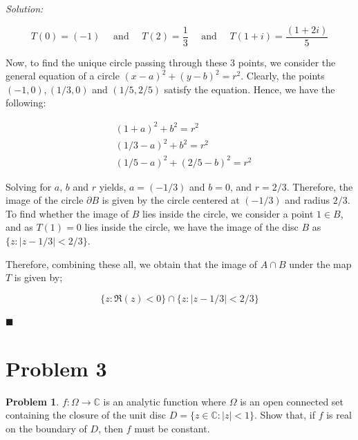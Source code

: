 \documentclass[12pt]{article}
\newcommand{\C}{\mathbb{C}}
\theoremstyle{definition}
\newtheorem*{prb}{Problem}
\newenvironment{problem}{
\begin{tcolorbox}[colback=blue!5!white,colframe=blue!75!black, parbox = true] \begin{prb}  }{\end{prb}\end{tcolorbox} }
\newenvironment{answer}{\textit{Solution: }\quad }{ \hfill $\blacksquare$}
\numberwithin{equation}{section}
\begin{document}
\begin{answer}
\begin{enumerate}
		$$
		T(0) = (-1) \quad \text{ and } \quad
		T(2) = \dfrac{1}{3} \quad \text{ and } \quad
		T(1+i) = \dfrac{(1 + 2i)}{5}
		$$

		Now, to find the unique circle passing through these 3 points, we consider the general equation of a circle $(x - a)^2 + (y-b)^2 = r^2$. Clearly, the points $(-1, 0), (1/3, 0)$ and $(1/5, 2/5)$ satisfy the equation. Hence, we have the following:

		\begin{align*}
			& (1 + a)^2 + b^2 = r^2\\
			& (1/3 - a)^2 + b^2 = r^2\\
			& (1/5 - a)^2 + (2/5 - b)^2 = r^2
		\end{align*}

		Solving for $a$, $b$ and $r$ yields, $a = (-1/3)$ and $b = 0$, and $r = 2/3$.  Therefore, the image of the circle $\partial B$ is given by the circle centered at $(-1/3)$ and radius $2/3$. To find whether the image of $B$ lies inside the circle, we consider a point $1 \in B$, and as $T(1) = 0$ lies inside the circle, we have the image of the disc $B$ as $\{ z : \vert z - 1/3 \vert < 2/3\}$. 

		Therefore, combining these all, we obtain that the image of $A \cap B$ under the map $T$ is given by;

		$$
		\{ z : \Re(z) < 0\} \cap \{ z : \vert z - 1/3 \vert < 2/3 \}
		$$

	\end{enumerate}
\end{answer}

\pagebreak

\section{Problem 3}
\begin{problem}
	$f : \Omega \rightarrow \C$ is an analytic function where $\Omega$ is an open connected set containing the closure of the unit disc $D = \{ z\in\C : |z| < 1\}$. Show that, if $f$ is real on the boundary of $D$, then $f$ must be constant.
\end{problem}
\end{document}
